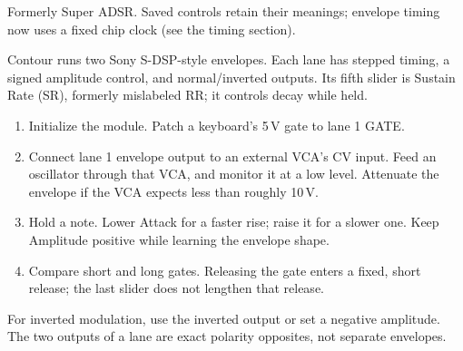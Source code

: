 Formerly Super ADSR. Saved controls retain their meanings; envelope timing
now uses a fixed chip clock (see the timing section).

Contour runs two Sony S-DSP-style envelopes. Each lane has stepped timing,
a signed amplitude control, and normal/inverted outputs. Its fifth slider
is Sustain Rate (SR), formerly mislabeled RR; it controls decay while held.

\begin{enumerate}
\item Initialize the module. Patch a keyboard's 5\,V gate to lane 1 GATE.
\item Connect lane 1 envelope output to an external VCA's CV input. Feed an
oscillator through that VCA, and monitor it at a low level. Attenuate the
envelope if the VCA expects less than roughly 10\,V.
\item Hold a note. Lower Attack for a faster rise; raise it for a slower one.
Keep Amplitude positive while learning the envelope shape.
\item Compare short and long gates. Releasing the gate enters a fixed,
short release; the last slider does not lengthen that release.
\end{enumerate}

For inverted modulation, use the inverted output or set a negative amplitude.
The two outputs of a lane are exact polarity opposites, not separate envelopes.
